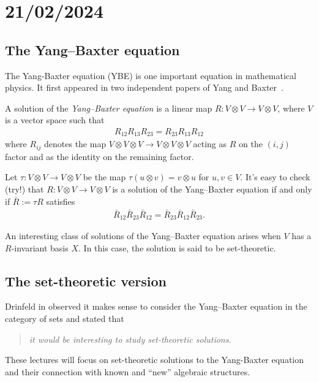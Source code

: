 \section{21/02/2024}

\subsection{The Yang--Baxter equation}
The Yang-Baxter equation (YBE) is one important equation in mathematical physics.
It first appeared in two independent papers of Yang \cite{Yang1967} and Baxter\
\cite{Baxter1971}.

\begin{definition}
    A solution of the \emph{Yang--Baxter equation} is a linear map  $R: V\otimes V \to V \otimes V$, where $V$ is a vector space such that
    \begin{align*}
        R_{12}R_{13}R_{23} = R_{23}R_{13}R_{12}
    \end{align*}
    where $R_{ij}$ denotes the map $V\otimes V\otimes V \to V \otimes V \otimes V$ acting as $R$ on the $(i,j)$
    factor and as the identity on the remaining factor.
\end{definition}
    Let $\tau: V\otimes V \to V \otimes V$ be the map $\tau(u\otimes v) = v \otimes u$ for $u,v \in V$.
    It's easy to check (try!) that $R: V \otimes V \to V \otimes V$ is a solution of the Yang--Baxter equation if and only if $\bar{R}:=\tau R$ satisfies 
    \begin{align*}
        \bar{R}_{12}\bar{R}_{23}\bar{R}_{12}=\bar{R}_{23}\bar{R}_{12}\bar{R}_{23}.
    \end{align*}

    An interesting class of solutions of the Yang--Baxter equation arises when $V$ has a $R$-invariant basis $X$. In this case, the solution is said to be set-theoretic. 

\subsection{The set-theoretic version}
    Drinfeld in \cite{Dri1992} observed it makes sense to consider the Yang--Baxter equation in the category of sets and stated that 

    
    \begin{quote}\textit{it would be interesting to study set-theoretic solutions.}\end{quote}
    

    These lectures will focus on set-theoretic solutions to the Yang-Baxter equation and their connection with known and ``new'' algebraic structures. 

